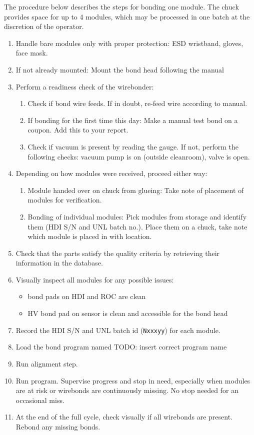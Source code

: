\documentclass[12pt]{unlsilabsop}
\begin{document}
The procedure below describes the steps for bonding one module. The chuck provides space for up to 4 modules, which may be processed in one batch at the discretion of the operator.
\begin{enumerate}
    \item Handle bare modules only with proper protection: ESD wristband, gloves, face mask.
    \item If not already mounted: Mount the bond head following the manual
    \item Perform a readiness check of the wirebonder:
    \begin{enumerate}
	\item Check if bond wire feeds. If in doubt, re-feed wire according to manual.
	\item If bonding for the first time this day: Make a manual test bond on a coupon. Add this to your report.
	\item Check if vacuum is present by reading the gauge. If not, perform the following checks: vacuum pump is on (outside cleanroom), valve is open.
    \end{enumerate}
    \item Depending on how modules were received, proceed either way:
    \begin{enumerate}
	\item Module handed over on chuck from glueing: Take note of placement of modules for verification.
	\item Bonding of individual modules: Pick modules from storage and identify them (HDI S/N and UNL batch no.). Place them on a chuck, take note which module is placed in with location.
    \end{enumerate}
    \item Check that the parts satisfy the quality criteria by retrieving their information in the database. 
    \item Visually inspect all modules for any possible issues:
    \begin{itemize}
	\item bond pads on HDI and ROC are clean
	\item HV bond pad on sensor is clean and accessible for the bond head
    \end{itemize}
    \item Record the HDI S/N and UNL batch id (\texttt{Nxxxyy}) for each module.
    \item Load the bond program named TODO: insert correct program name
    \item Run alignment step.
    \item Run program. Supervise progress and stop in need, especially when modules are at risk or wirebonds are continuously missing. No stop needed for an occasional miss.
    \item At the end of the full cycle, check visually if all wirebonds are present. Rebond any missing bonds.
\end{enumerate}
\end{document}
